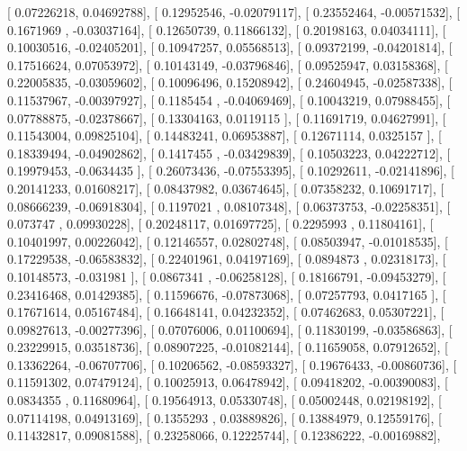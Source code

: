 \documentclass{article}
\begin{document}
       [ 0.07226218,  0.04692788],
       [ 0.12952546, -0.02079117],
       [ 0.23552464, -0.00571532],
       [ 0.1671969 , -0.03037164],
       [ 0.12650739,  0.11866132],
       [ 0.20198163,  0.04034111],
       [ 0.10030516, -0.02405201],
       [ 0.10947257,  0.05568513],
       [ 0.09372199, -0.04201814],
       [ 0.17516624,  0.07053972],
       [ 0.10143149, -0.03796846],
       [ 0.09525947,  0.03158368],
       [ 0.22005835, -0.03059602],
       [ 0.10096496,  0.15208942],
       [ 0.24604945, -0.02587338],
       [ 0.11537967, -0.00397927],
       [ 0.1185454 , -0.04069469],
       [ 0.10043219,  0.07988455],
       [ 0.07788875, -0.02378667],
       [ 0.13304163,  0.0119115 ],
       [ 0.11691719,  0.04627991],
       [ 0.11543004,  0.09825104],
       [ 0.14483241,  0.06953887],
       [ 0.12671114,  0.0325157 ],
       [ 0.18339494, -0.04902862],
       [ 0.1417455 , -0.03429839],
       [ 0.10503223,  0.04222712],
       [ 0.19979453, -0.0634435 ],
       [ 0.26073436, -0.07553395],
       [ 0.10292611, -0.02141896],
       [ 0.20141233,  0.01608217],
       [ 0.08437982,  0.03674645],
       [ 0.07358232,  0.10691717],
       [ 0.08666239, -0.06918304],
       [ 0.1197021 ,  0.08107348],
       [ 0.06373753, -0.02258351],
       [ 0.073747  ,  0.09930228],
       [ 0.20248117,  0.01697725],
       [ 0.2295993 ,  0.11804161],
       [ 0.10401997,  0.00226042],
       [ 0.12146557,  0.02802748],
       [ 0.08503947, -0.01018535],
       [ 0.17229538, -0.06583832],
       [ 0.22401961,  0.04197169],
       [ 0.0894873 ,  0.02318173],
       [ 0.10148573, -0.031981  ],
       [ 0.0867341 , -0.06258128],
       [ 0.18166791, -0.09453279],
       [ 0.23416468,  0.01429385],
       [ 0.11596676, -0.07873068],
       [ 0.07257793,  0.0417165 ],
       [ 0.17671614,  0.05167484],
       [ 0.16648141,  0.04232352],
       [ 0.07462683,  0.05307221],
       [ 0.09827613, -0.00277396],
       [ 0.07076006,  0.01100694],
       [ 0.11830199, -0.03586863],
       [ 0.23229915,  0.03518736],
       [ 0.08907225, -0.01082144],
       [ 0.11659058,  0.07912652],
       [ 0.13362264, -0.06707706],
       [ 0.10206562, -0.08593327],
       [ 0.19676433, -0.00860736],
       [ 0.11591302,  0.07479124],
       [ 0.10025913,  0.06478942],
       [ 0.09418202, -0.00390083],
       [ 0.0834355 ,  0.11680964],
       [ 0.19564913,  0.05330748],
       [ 0.05002448,  0.02198192],
       [ 0.07114198,  0.04913169],
       [ 0.1355293 ,  0.03889826],
       [ 0.13884979,  0.12559176],
       [ 0.11432817,  0.09081588],
       [ 0.23258066,  0.12225744],
       [ 0.12386222, -0.00169882],
\end{document}
